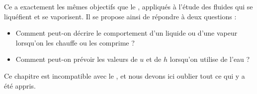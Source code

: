 Ce \courscinqshort a exactement les mêmes objectifs que le \coursquatre, appliqués à l’étude des fluides qui se liquéfient et se vaporisent. Il se propose ainsi de répondre à deux questions :
\begin{itemize}
	\item Comment peut-on décrire le comportement d’un liquide ou d’une vapeur lorsqu’on les chauffe ou les comprime ?
	\item Comment peut-on prévoir les valeurs de $u$ et de $h$ lorsqu’on utilise de l’eau ?
\end{itemize}
Ce chapitre est incompatible avec le \coursquatre, et nous devons ici oublier tout ce qui y a été appris.
